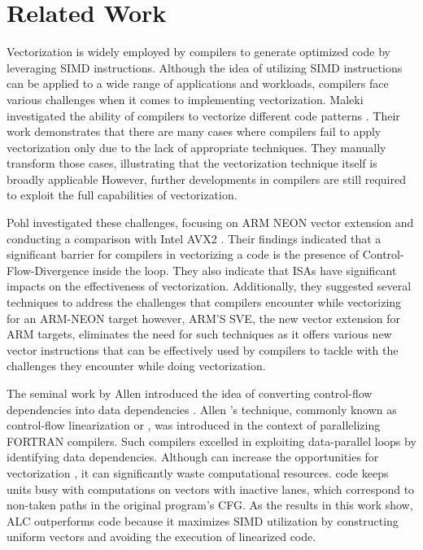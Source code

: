 \chapter{Related Work}
\label{sec:related-works}

Vectorization is widely employed by compilers to generate optimized code by leveraging SIMD instructions. Although the idea of utilizing SIMD instructions can be applied to a wide range of applications and workloads, compilers face various challenges when it comes to implementing vectorization. Maleki \etal investigated the ability of compilers to vectorize different code patterns \cite{maleki2011evaluation}. Their work demonstrates that there are many cases where compilers fail to apply vectorization only due to the lack of appropriate techniques. They manually transform those cases,
illustrating that the vectorization technique itself is broadly applicable However, further developments in compilers are still required to exploit the full capabilities of vectorization.

Pohl \etal investigated these challenges, focusing on ARM NEON vector extension and conducting a comparison with Intel AVX2 \cite{pohl_control_2018}. Their findings indicated that a significant barrier for compilers in vectorizing a code is the presence of Control-Flow-Divergence inside the loop. They also indicate that ISAs have significant impacts on the effectiveness of vectorization. Additionally, they suggested several techniques to address the challenges that compilers encounter while vectorizing for an ARM-NEON target however, ARM'S SVE, the new vector extension for ARM targets, eliminates the need for such techniques as it offers various new vector instructions that can be effectively used by compilers to tackle with the challenges they encounter while doing vectorization.




The seminal work by Allen \etal introduced the idea of converting control-flow dependencies into data dependencies \cite{allen_conversion_1983}.
Allen \etal's technique, commonly known as control-flow linearization or \ifconversion \cite{park1991ifconversion}, was introduced in the context of parallelizing FORTRAN compilers.
Such compilers excelled in exploiting data-parallel loops by identifying data dependencies.
Although \ifconversion can increase the opportunities for vectorization \cite{jaewook_shin_superword-level_2005}, it can significantly waste computational resources. \ifconverted code keeps units busy with computations on vectors with inactive lanes, which correspond to non-taken paths in the original program's CFG.
As the results in this work show, ALC outperforms \ifconverted code because it maximizes SIMD utilization by constructing uniform vectors and avoiding the execution of linearized code.

